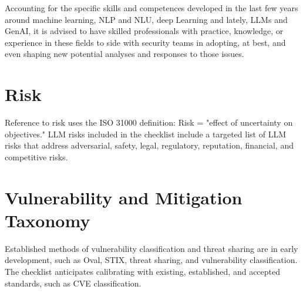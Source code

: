 Accounting for the specific skills and competences developed in the last few
years around machine learning, NLP and NLU, deep Learning and lately, LLMs and
GenAI, it is advised to have skilled professionals with practice, knowledge, or
experience in these fields to side with security teams in adopting, at best,
and even shaping new potential analyses and responses to those issues.

\section{Risk}
Reference to risk uses the ISO 31000 definition: Risk = "effect of uncertainty on objectives."
LLM risks included in the checklist include a targeted list of LLM risks that
address adversarial, safety, legal, regulatory, reputation, financial, and competitive risks.

\section{Vulnerability and Mitigation Taxonomy}
Established methods of vulnerability classification and threat sharing are in
early development, such as Oval, STIX, threat sharing, and vulnerability
classification. The checklist anticipates calibrating with existing,
established, and accepted standards, such as CVE classification.